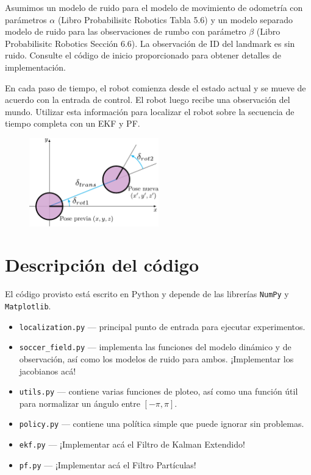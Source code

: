 \documentclass[tp]{lcc}
\begin{document}
	Asumimos un modelo de ruido para el modelo de movimiento de odometría con parámetros $\alpha$ (Libro Probabilisitc Robotics Tabla 5.6) y un modelo separado modelo de ruido para las observaciones de rumbo con parámetro $\beta$ (Libro Probabilisitc Robotics Sección 6.6). La observación de ID del landmark es sin ruido. Consulte el código de inicio proporcionado para obtener detalles de implementación.
	
	En cada paso de tiempo, el robot comienza desde el estado actual y se mueve de acuerdo con la entrada de control. El robot luego recibe una observación del mundo. Utilizar esta información para localizar el robot sobre la secuencia de tiempo completa con un EKF y PF.
	
	\begin{figure}[!htbp]
		\centering
		\includegraphics[width=0.5\textwidth]{./images/odometry_as_controls.pdf}
		\label{fig:odometry-base-motion-model}
	\end{figure}

	\section{Descripción del código}
	
	El código provisto está escrito en Python y depende de las librerías \lstinline[style=bash]{NumPy} y \lstinline[style=bash]{Matplotlib}.
	
	\begin{itemize}
		\item \lstinline[style=bash]{localization.py} --- principal punto de entrada para ejecutar experimentos.
		\item \lstinline[style=bash]{soccer_field.py} --- implementa las funciones del modelo dinámico y de observación, así como los modelos de ruido para ambos. ¡Implementar los jacobianos acá!
		\item \lstinline[style=bash]{utils.py} --- contiene varias funciones de ploteo, así como una función útil para normalizar un ángulo entre $[-\pi, \pi]$.
		\item \lstinline[style=bash]{policy.py} --- contiene una política simple que puede ignorar sin problemas.
		\item \lstinline[style=bash]{ekf.py} --- ¡Implementar acá el Filtro de Kalman Extendido!
		\item \lstinline[style=bash]{pf.py} --- ¡Implementar acá el Filtro Partículas!
	\end{itemize}
\end{document}
